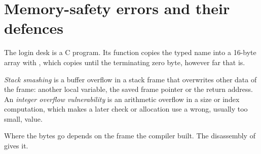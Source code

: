 \section{Memory-safety errors and their defences}\label{sec:b3:software-security:memory}

The login desk is a C program. Its  function copies the typed name into a 16-byte array with , which copies until the terminating zero byte, however far that is.

\label{lst:b3:software-security:login}

\begin{definition}\label{def:b3:software-security:memory}
\emph{Stack smashing} is a buffer overflow in a stack frame that overwrites other data of the frame: another local variable, the saved frame pointer or the return address. An \emph{integer overflow vulnerability} is an arithmetic overflow in a size or index computation, which makes a later check or allocation use a wrong, usually too small, value.
\end{definition}

Where the bytes go depends on the frame the compiler built. The disassembly of  gives it.

\label{out:b3:software-security:frame}

